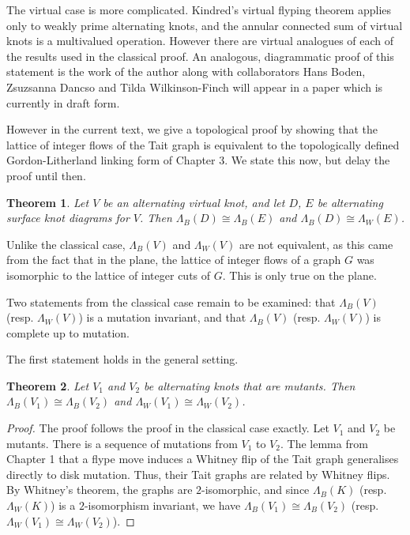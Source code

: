 \documentclass[12pt]{report}
\newtheorem*{theorem}{Theorem}
\begin{document}
The virtual case is more complicated. Kindred's virtual flyping theorem applies only to weakly prime alternating knots, and the annular connected sum of virtual knots is a multivalued operation. However there are virtual analogues of each of the results used in the classical proof. An analogous, diagrammatic proof of this statement is the work of the author along with collaborators Hans Boden, Zsuzsanna Dancso and Tilda Wilkinson-Finch will appear in a paper which is currently in draft form.

However in the current text, we give a topological proof by showing that the lattice of integer flows of the Tait graph is equivalent to the topologically defined Gordon-Litherland linking form of Chapter 3. We state this now, but delay the proof until then.

\begin{theorem}
Let $V$ be an alternating virtual knot, and let $D$, $E$ be alternating surface knot diagrams for $V$. Then $\Lambda_{B}(D) \cong \Lambda_{B}(E)$ and $\Lambda_{B}(D) \cong \Lambda_{W}(E)$.
\end{theorem}

Unlike the classical case, $\Lambda_{B}(V)$ and $\Lambda_{W}(V)$ are not equivalent, as this came from the fact that in the plane, the lattice of integer flows of a graph $G$ was isomorphic to the lattice of integer cuts of $G$. This is only true on the plane.

Two statements from the classical case remain to be examined: that $\Lambda_{B}(V)$ (resp. $\Lambda_{W}(V)$) is a mutation invariant, and that $\Lambda_{B}(V)$ (resp. $\Lambda_{W}(V)$) is complete up to mutation.

The first statement holds in the general setting.
\begin{theorem}
Let $V_{1}$ and $V_{2}$ be alternating knots that are mutants. Then $\Lambda_{B}(V_{1}) \cong \Lambda_{B}(V_{2})$ and $\Lambda_{W}(V_{1}) \cong \Lambda_{W}(V_{2})$.
\end{theorem}
\begin{proof}
The proof follows the proof in the classical case exactly. Let $V_{1}$ and $V_{2}$ be mutants. There is a sequence of mutations from $V_{1}$ to $V_{2}$. The lemma from Chapter 1 that a flype move induces a Whitney flip of the Tait graph generalises directly to disk mutation. Thus, their Tait graphs are related by Whitney flips. By Whitney's theorem, the graphs are $2$-isomorphic, and since $\Lambda_{B}(K)$ (resp. $\Lambda_{W}(K)$) is a $2$-isomorphism invariant, we have $\Lambda_{B}(V_{1}) \cong \Lambda_{B}(V_{2})$ (resp. $\Lambda_{W}(V_{1}) \cong \Lambda_{W}(V_{2})$).
\end{proof}
\end{document}
